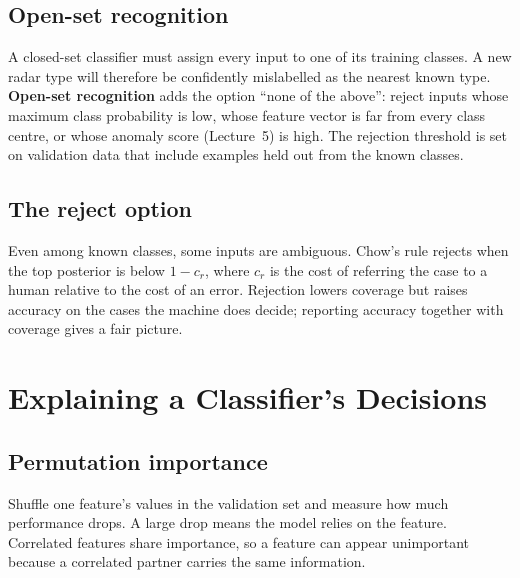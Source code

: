 \documentclass[11pt]{article}
\begin{document}
\subsection{Open-set recognition}
A closed-set classifier must assign every input to one of its training classes. A new radar type will therefore be confidently mislabelled as the nearest known type. \textbf{Open-set recognition} adds the option ``none of the above'': reject inputs whose maximum class probability is low, whose feature vector is far from every class centre, or whose anomaly score (Lecture~5) is high. The rejection threshold is set on validation data that include examples held out from the known classes.
\subsection{The reject option}
Even among known classes, some inputs are ambiguous. Chow's rule rejects when the top posterior is below $1-c_r$, where $c_r$ is the cost of referring the case to a human relative to the cost of an error. Rejection lowers coverage but raises accuracy on the cases the machine does decide; reporting accuracy together with coverage gives a fair picture.

\section{Explaining a Classifier's Decisions}
\subsection{Permutation importance}
Shuffle one feature's values in the validation set and measure how much performance drops. A large drop means the model relies on the feature. Correlated features share importance, so a feature can appear unimportant because a correlated partner carries the same information.
\end{document}
